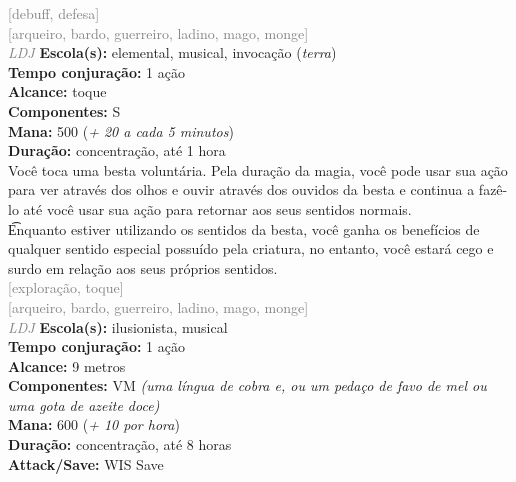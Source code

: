 \documentclass{RPG_Adventure}[2021/10/20]
\begin{document}
{\scriptsize \textcolor{gray}{[debuff, defesa]\\}}
{\scriptsize \textcolor{gray}{[arqueiro, bardo, guerreiro, ladino, mago, monge]\\}}
{\tiny \textcolor{gray}{\textit{LDJ}}}\jump{}
{\small \t \textbf{Escola(s):} elemental, musical, invocação (\textit{terra})\\\t \textbf{Tempo conjuração:} 1 ação\\\t \textbf{Alcance:} toque\\\t \textbf{Componentes:} S\\\t \textbf{Mana:} 500 (\textit{+ 20 a cada 5 minutos})\\\t \textbf{Duração:} concentração, até 1 hora\\}
{\normalsize Você toca uma besta voluntária. Pela duração da magia, você pode usar sua ação para ver através dos olhos e ouvir através dos ouvidos da besta e continua a fazê-lo até você usar sua ação para retornar aos seus sentidos normais.\\\t Enquanto estiver utilizando os sentidos da besta, você ganha os benefícios de qualquer sentido especial possuído pela criatura, no entanto, você estará cego e surdo em relação aos seus próprios sentidos.\\}
{\scriptsize \textcolor{gray}{[exploração, toque]\\}}
{\scriptsize \textcolor{gray}{[arqueiro, bardo, guerreiro, ladino, mago, monge]\\}}
{\tiny \textcolor{gray}{\textit{LDJ}}}\jump{}
{\small \t \textbf{Escola(s):} ilusionista, musical\\\t \textbf{Tempo conjuração:} 1 ação\\\t \textbf{Alcance:} 9 metros\\\t \textbf{Componentes:} VM \textit{(uma língua de cobra e, ou um pedaço de favo de mel ou uma gota de azeite doce)}\\\t \textbf{Mana:} 600 (\textit{+ 10 por hora})\\\t \textbf{Duração:} concentração, até 8 horas\\\t \textbf{Attack/Save:} WIS Save\\}
\end{document}
